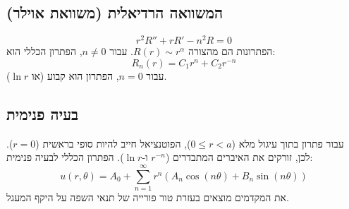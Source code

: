 \documentclass{article}
\begin{document}
\subsection{המשוואה הרדיאלית (משוואת אוילר)}
\begin{equation}
    r^2 R'' + r R' - n^2 R = 0
\end{equation}
הפתרונות הם מהצורה $R(r) \sim r^\alpha$.
עבור $n \neq 0$, הפתרון הכללי הוא:
$$ R_n(r) = C_1 r^n + C_2 r^{-n} $$
עבור $n = 0$, הפתרון הוא קבוע (או $\ln r$).

\subsection{בעיה פנימית}
עבור פתרון בתוך עיגול מלא ($0 \le r < a$), הפוטנציאל חייב להיות סופי בראשית ($r=0$). לכן, זורקים את האיברים המתבדרים ($r^{-n}$ ו-$\ln r$).
הפתרון הכללי לבעיה פנימית:
\begin{equation}
    u(r,\theta) = A_0 + \sum_{n=1}^{\infty} r^n (A_n \cos(n\theta) + B_n \sin(n\theta))
\end{equation}
את המקדמים מוצאים בעזרת טור פורייה של תנאי השפה על היקף המעגל.
\end{document}
